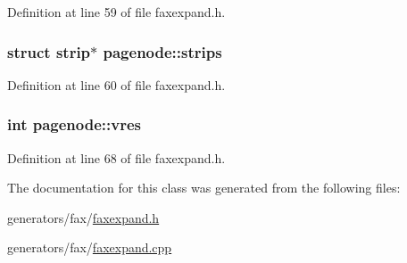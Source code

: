 Definition at line 59 of file faxexpand.\+h.

\hypertarget{classpagenode_a75866934e4e0cd1d789a1830dea955fb}{
\subsubsection[{strips}]{\setlength{\rightskip}{0pt plus 5cm}struct {\bf strip}$\ast$ pagenode\+::strips}}\label{classpagenode_a75866934e4e0cd1d789a1830dea955fb}


Definition at line 60 of file faxexpand.\+h.

\hypertarget{classpagenode_aa1341d0cb5be8f02e2c7cafd5d690a7b}{
\subsubsection[{vres}]{\setlength{\rightskip}{0pt plus 5cm}int pagenode\+::vres}}\label{classpagenode_aa1341d0cb5be8f02e2c7cafd5d690a7b}


Definition at line 68 of file faxexpand.\+h.



The documentation for this class was generated from the following files\+:\begin{DoxyCompactItemize}
\item 
generators/fax/\hyperlink{faxexpand_8h}{faxexpand.\+h}\item 
generators/fax/\hyperlink{faxexpand_8cpp}{faxexpand.\+cpp}\end{DoxyCompactItemize}
